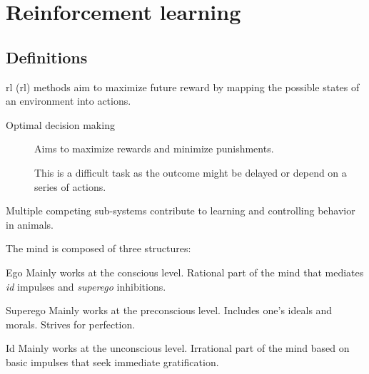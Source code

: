 \chapter{Reinforcement learning}


\section{Definitions}

\Acl{rl} (\acs{rl}) methods aim to maximize future reward by mapping the possible states of an environment into actions.

\begin{description}
    \item[Optimal decision making] 
        Aims to maximize rewards and minimize punishments.

        \begin{remark}
            This is a difficult task as the outcome might be delayed or depend on a series of actions.
            
        \end{remark}
\end{description}

\begin{remark}
    Multiple competing sub-systems contribute to learning and controlling behavior in animals.

    \indenttbox
    \begin{example}
        The mind is composed of three structures:
        \begin{descriptionlist}
            \item[Ego]
                Mainly works at the conscious level.
                Rational part of the mind that mediates \textit{id} impulses and \textit{superego} inhibitions.

            \item[Superego] 
                Mainly works at the preconscious level.
                Includes one's ideals and morals. Strives for perfection.

            \item[Id] 
                Mainly works at the unconscious level.
                Irrational part of the mind based on basic impulses that seek immediate gratification.
        \end{descriptionlist}
    \end{example}
\end{remark}


